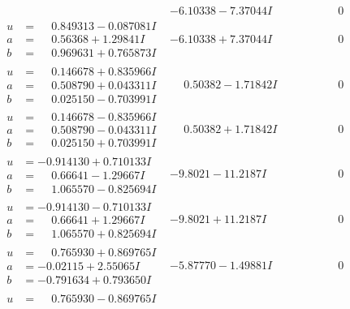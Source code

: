 \documentclass[1p]{elsarticle_modified}
\theoremstyle{definition}
\begin{document}
$$\begin{array}{c|c|c}
 & -6.10338 - 7.37044 I & \phantom{-0.000000 } 0 \\ \hline\begin{aligned}
u &= \phantom{-}0.849313 - 0.087081 I \\
a &= \phantom{-}0.56368 + 1.29841 I \\
b &= \phantom{-}0.969631 + 0.765873 I\end{aligned}
 & -6.10338 + 7.37044 I & \phantom{-0.000000 } 0 \\ \hline\begin{aligned}
u &= \phantom{-}0.146678 + 0.835966 I \\
a &= \phantom{-}0.508790 + 0.043311 I \\
b &= \phantom{-}0.025150 - 0.703991 I\end{aligned}
 & \phantom{-}0.50382 - 1.71842 I & \phantom{-0.000000 } 0 \\ \hline\begin{aligned}
u &= \phantom{-}0.146678 - 0.835966 I \\
a &= \phantom{-}0.508790 - 0.043311 I \\
b &= \phantom{-}0.025150 + 0.703991 I\end{aligned}
 & \phantom{-}0.50382 + 1.71842 I & \phantom{-0.000000 } 0 \\ \hline\begin{aligned}
u &= -0.914130 + 0.710133 I \\
a &= \phantom{-}0.66641 - 1.29667 I \\
b &= \phantom{-}1.065570 - 0.825694 I\end{aligned}
 & -9.8021 - 11.2187 I & \phantom{-0.000000 } 0 \\ \hline\begin{aligned}
u &= -0.914130 - 0.710133 I \\
a &= \phantom{-}0.66641 + 1.29667 I \\
b &= \phantom{-}1.065570 + 0.825694 I\end{aligned}
 & -9.8021 + 11.2187 I & \phantom{-0.000000 } 0 \\ \hline\begin{aligned}
u &= \phantom{-}0.765930 + 0.869765 I \\
a &= -0.02115 + 2.55065 I \\
b &= -0.791634 + 0.793650 I\end{aligned}
 & -5.87770 - 1.49881 I & \phantom{-0.000000 } 0 \\ \hline\begin{aligned}
u &= \phantom{-}0.765930 - 0.869765 I \\

\end{aligned}
\end{array}$$
\end{document}
